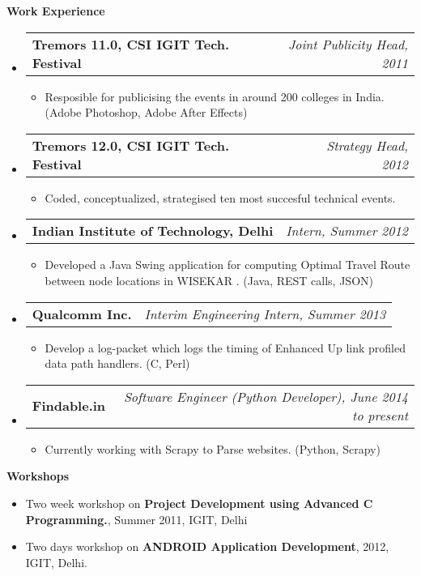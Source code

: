\documentclass[letterpaper,10pt]{article}
\makeatletter
\newcommand{\resitem}[1]{\item #1 \vspace{-2pt}}
\newcommand{\resheading}[1]{{\large \colorbox{mygrey}{\begin{minipage}{\textwidth}{\textbf{#1 \vphantom{p\^{E}}}}\end{minipage}}}}
\newcommand{\ressubheading}[4]{
\begin{tabular*}{7.0in}{l@{\extracolsep{\fill}}r}
		\textbf{#1} & \textit{#4} \\
\end{tabular*}\vspace{-6pt}}
\makeatother
\begin{document}
\resheading{Work Experience}
\begin{itemize}

\item
	\ressubheading{Tremors 11.0, CSI IGIT Tech. Festival}{Delhi}{Joint Publicity Head}{Joint Publicity Head, 2011}
	\begin{itemize}
		\resitem{Resposible for publicising the events in around 200 colleges in India.  (Adobe Photoshop, Adobe After Effects)}
	\end{itemize}

\item
	\ressubheading{Tremors 12.0, CSI IGIT Tech. Festival}{Delhi}{Strategy Head}{Strategy Head, 2012}
	\begin{itemize}
		\resitem{Coded, conceptualized, strategised ten most succesful technical events.}
	\end{itemize}
\item
	\ressubheading{Indian Institute of Technology, Delhi}{Delhi, India}{Intern}{Intern, Summer 2012}
	\begin{itemize}
		\resitem{Developed a Java Swing application for computing Optimal Travel Route between node locations in WISEKAR
.  (Java, REST calls, JSON)}
	\end{itemize}

\item
	\ressubheading{Qualcomm Inc.}{Hyderabad, India}{Interim Engineering Intern}{Interim Engineering Intern, Summer 2013}
	\begin{itemize}
		\resitem{Develop a log-packet which logs the timing of Enhanced Up link profiled data path handlers.  (C, Perl)}
	\end{itemize}

\item
	\ressubheading{Findable.in}{Delhi}{Software Engineer (Python Developer)}{Software Engineer (Python Developer), June 2014 to present}
	\begin{itemize}
		\resitem{Currently working with Scrapy to Parse websites.  (Python, Scrapy)}
	\end{itemize}

\end{itemize}

\resheading{Workshops}
\begin{itemize}
	\item {Two week workshop on \textbf{Project Development using Advanced C Programming.}, Summer 2011, IGIT, Delhi }
	\item {Two days workshop on \textbf{ANDROID Application Development}, 2012, IGIT, Delhi.}

\end{itemize}
\end{document}
